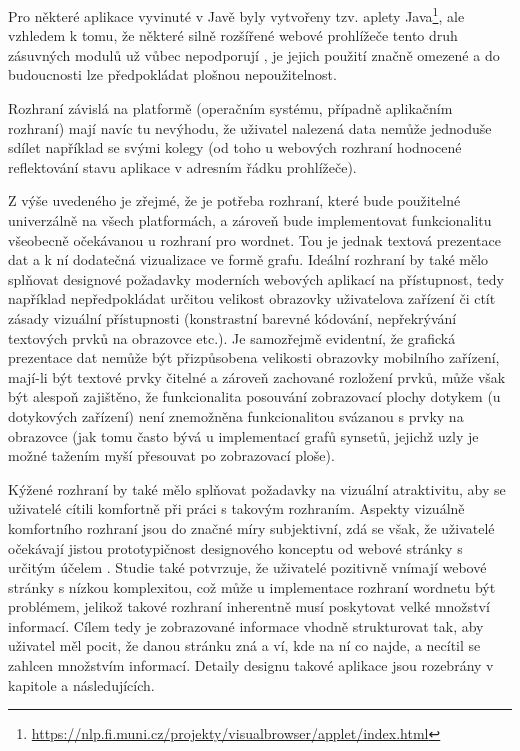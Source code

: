\documentclass[a4paper, 11pt, oneside]{book}
\newcommand{\itNameRef}[1]{\textit{\nameref{#1}}}
\begin{document}
			Pro některé aplikace vyvinuté v Javě byly vytvořeny tzv. aplety Java\footnote{\url{https://nlp.fi.muni.cz/projekty/visualbrowser/applet/index.html}}, ale vzhledem k tomu, že některé silně rozšířené webové prohlížeče tento druh zásuvných modulů už vůbec nepodporují \parencite{MozzilaFoundation2017}, je jejich použití značně omezené a do budoucnosti lze předpokládat plošnou nepoužitelnost. 

			Rozhraní závislá na platformě (operačním systému, případně aplikačním rozhraní) mají navíc tu nevýhodu, že uživatel nalezená data nemůže jednoduše sdílet například se svými kolegy (od toho u webových rozhraní hodnocené reflektování stavu aplikace v adresním řádku prohlížeče). 

			Z výše uvedeného je zřejmé, že je potřeba rozhraní, které bude použitelné univerzálně na všech platformách, a zároveň bude implementovat funkcionalitu všeobecně očekávanou u rozhraní pro wordnet. Tou je jednak textová prezentace dat a k ní dodatečná vizualizace ve formě grafu. Ideální rozhraní by také mělo splňovat designové požadavky moderních webových aplikací na přístupnost, tedy například nepředpokládat určitou velikost obrazovky uživatelova zařízení či ctít zásady vizuální přístupnosti (konstrastní barevné kódování, nepřekrývání textových prvků na obrazovce etc.). Je samozřejmě evidentní, že grafická prezentace dat nemůže být přizpůsobena velikosti obrazovky mobilního zařízení, mají-li být textové prvky čitelné a zároveň zachované rozložení prvků, může však být alespoň zajištěno, že funkcionalita posouvání zobrazovací plochy dotykem (u dotykových zařízení) není znemožněna funkcionalitou svázanou s prvky na obrazovce (jak tomu často bývá u implementací grafů synsetů, jejichž uzly je možné tažením myší přesouvat po zobrazovací ploše). 

			Kýžené rozhraní by také mělo splňovat požadavky na vizuální atraktivitu, aby se uživatelé cítili komfortně při práci s takovým rozhraním. Aspekty vizuálně komfortního rozhraní jsou do značné míry subjektivní, zdá se však, že uživatelé očekávají jistou prototypičnost designového konceptu od webové stránky s určitým účelem \parencite{walker2013simple, tuch2012role}. Studie \parencite{tuch2012role} také potvrzuje, že uživatelé pozitivně vnímají webové stránky s nízkou komplexitou, což může u implementace rozhraní wordnetu být problémem, jelikož takové rozhraní inherentně musí poskytovat velké množství informací. Cílem tedy je zobrazované informace vhodně strukturovat tak, aby uživatel měl pocit, že danou stránku zná a ví, kde na ní co najde, a necítil se zahlcen množstvím informací. Detaily designu takové aplikace jsou rozebrány v kapitole \itNameRef{cha:navrh} a následujících.
\end{document}
